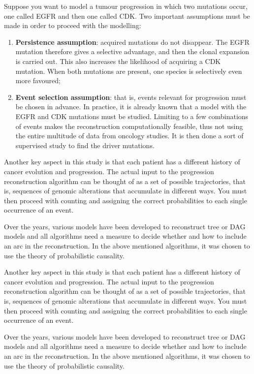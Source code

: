 Suppose you want to model a tumour progression in which two mutations occur, one called EGFR and 
then one called CDK. Two important assumptions must be made in order to proceed with the modelling:
\begin{enumerate}
    \item \textbf{Persistence assumption}: acquired mutations do not disappear. The EGFR mutation
        therefore gives a selective advantage, and then the clonal expansion is carried out. This 
        also increases the likelihood of acquiring a CDK mutation. When both mutations are present, 
        one species is selectively even more favoured;
    \item \textbf{Event selection assumption}: that is, events relevant for progression must be chosen 
        in advance. In practice, it is already known that a model with the EGFR and CDK mutations must 
        be studied. Limiting to a few combinations of events makes the reconstruction computationally 
        feasible, thus not using the entire multitude of data from oncology studies. It is then done a 
        sort of supervised study to find the driver mutations.
\end{enumerate}

Another key aspect in this study is that each patient has a different history of cancer evolution 
and progression. The actual input to the progression reconstruction algorithm can be thought of as 
a set of possible trajectories, that is, sequences of genomic alterations that accumulate in 
different ways. You must then proceed with counting and assigning the correct probabilities to each 
single occurrence of an event.

Over the years, various models have been developed to reconstruct tree or DAG models and all algorithms
need a measure to decide whether and how to include an arc in the reconstruction. In the above 
mentioned algorithms, it was chosen to use the theory of probabilistic causality.

Another key aspect in this study is that each patient has a different history of cancer evolution and
progression. The actual input to the progression reconstruction algorithm can be thought of as a set of 
possible trajectories, that is, sequences of genomic alterations that accumulate in different ways. You 
must then proceed with counting and assigning the correct probabilities to each single occurrence of an 
event.

Over the years, various models have been developed to reconstruct tree or DAG models and all algorithms 
need a measure to decide whether and how to include an arc in the reconstruction. In the above mentioned 
algorithms, it was chosen to use the theory of probabilistic causality.

